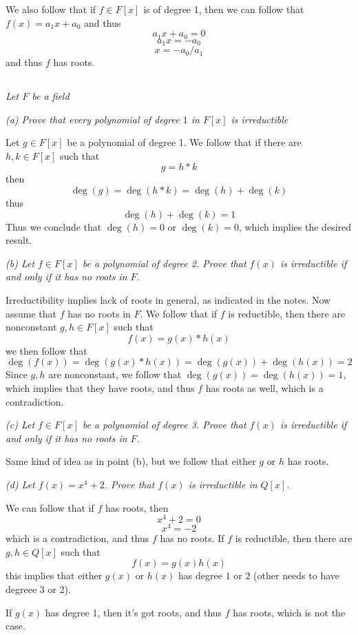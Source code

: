 \documentclass[11pt,oneside,titlepage]{book}
\begin{document}
We also follow that if $f \in F[x]$ is of degree 1, then
we can follow that $f(x) = a_1 x + a_0$
and thus
$$a_1 x + a_0 = 0$$
$$a_1 x = - a_0$$
$$ x = - a_0 / a_1$$
and thus $f$ has roots. 

\subsection{}

\textit{Let $F$ be a field}

\textit{(a) Prove that every polynomial of degree $1$ in $F[x]$ is irreductible}

Let $g \in F[x]$ be a polynomial of degree 1. We follow that if there
are $h, k \in F[x]$ such that
$$g = h * k$$
then
$$\deg(g) = \deg(h * k) = \deg(h) + \deg(k)$$
thus
$$\deg(h) + \deg(k) = 1$$
Thus we conclude that $\deg(h) = 0$ or $\deg(k) = 0$, which implies
the desired result.

\textit{(b) Let $f \in F[x]$ be a polynomial of degree 2. Prove that
  $f(x)$ is irreductible if and only if it has no roots in $F$.}

Irreductibility implies lack of roots in general, as indicated in the
notes. Now assume that $f$ has no roots in $F$. We follow that if $f$
is reductible, then there are nonconstant $g, h \in F[x]$
such that
$$f(x) = g(x) * h(x)$$
we then follow that
$$\deg(f(x)) = \deg(g(x) * h(x)) = \deg(g(x)) + \deg(h(x)) = 2$$
Since $g, h$ are nonconstant, we follow that $\deg(g(x)) = \deg(h(x))
= 1$, which implies that they have roots, and thus $f$ has roots as
well, which is a contradiction.

\textit{(c) Let $f \in F[x]$ be a polynomial of degree 3. Prove that
  $f(x)$ is irreductible if and only if it has no roots in $F$.}

Same kind of idea as in point (b), but we follow that either $g$
or $h$ has roots.

\textit{(d) Let $f(x) = x^4 + 2$. Prove that $f(x)$ is irreductible in
  $Q[x]$.}

We can follow that if $f$ has roots, then
$$x^4 + 2 = 0$$
$$x^4 = -2$$
which is a contradiction, and thus $f$ has no roots. If $f$ is
reductible, then there are $g, h \in Q[x]$
such that
$$f(x) = g(x) h(x)$$
this implies that either $g(x)$ or $h(x)$ has degree $1$ or $2$ (other needs to
have degreee 3 or 2).

If $g(x)$ has degree 1, then it's got roots, and thus $f$ has roots,
which is not the case.
\end{document}
